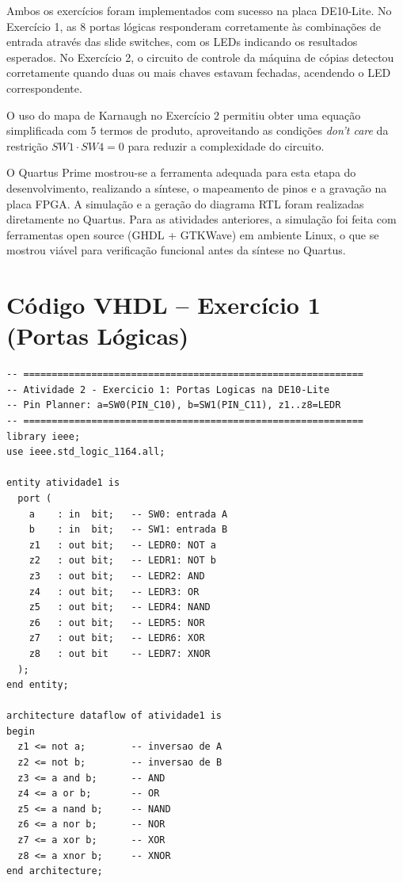 \documentclass[12pt,a4paper, brazil]{article}
\begin{document}
Ambos os exercícios foram implementados com sucesso na placa DE10-Lite. No Exercício 1, as 8 portas lógicas responderam corretamente às combinações de entrada através das slide switches, com os LEDs indicando os resultados esperados. No Exercício 2, o circuito de controle da máquina de cópias detectou corretamente quando duas ou mais chaves estavam fechadas, acendendo o LED correspondente.

O uso do mapa de Karnaugh no Exercício 2 permitiu obter uma equação simplificada com 5 termos de produto, aproveitando as condições \textit{don't care} da restrição $SW1 \cdot SW4 = 0$ para reduzir a complexidade do circuito.

O Quartus Prime mostrou-se a ferramenta adequada para esta etapa do desenvolvimento, realizando a síntese, o mapeamento de pinos e a gravação na placa FPGA. A simulação e a geração do diagrama RTL foram realizadas diretamente no Quartus. Para as atividades anteriores, a simulação foi feita com ferramentas open source (GHDL + GTKWave) em ambiente Linux, o que se mostrou viável para verificação funcional antes da síntese no Quartus.

\appendix

\newpage
\section{Código VHDL -- Exercício 1 (Portas Lógicas)}
\label{ap:codigo-ex1}

\begin{lstlisting}[style=vhdl, caption={Arquivo atividade1.vhd -- 8 portas lógicas na DE10-Lite.}]
-- ============================================================
-- Atividade 2 - Exercicio 1: Portas Logicas na DE10-Lite
-- Pin Planner: a=SW0(PIN_C10), b=SW1(PIN_C11), z1..z8=LEDR
-- ============================================================
library ieee;
use ieee.std_logic_1164.all;

entity atividade1 is
  port (
    a    : in  bit;   -- SW0: entrada A
    b    : in  bit;   -- SW1: entrada B
    z1   : out bit;   -- LEDR0: NOT a
    z2   : out bit;   -- LEDR1: NOT b
    z3   : out bit;   -- LEDR2: AND
    z4   : out bit;   -- LEDR3: OR
    z5   : out bit;   -- LEDR4: NAND
    z6   : out bit;   -- LEDR5: NOR
    z7   : out bit;   -- LEDR6: XOR
    z8   : out bit    -- LEDR7: XNOR
  );
end entity;

architecture dataflow of atividade1 is
begin
  z1 <= not a;        -- inversao de A
  z2 <= not b;        -- inversao de B
  z3 <= a and b;      -- AND
  z4 <= a or b;       -- OR
  z5 <= a nand b;     -- NAND
  z6 <= a nor b;      -- NOR
  z7 <= a xor b;      -- XOR
  z8 <= a xnor b;     -- XNOR
end architecture;
\end{lstlisting}
\end{document}
